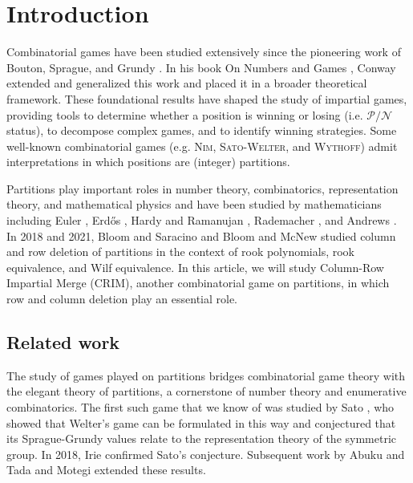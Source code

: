 \documentclass[pdflatex,sn-mathphys-num]{sn-jnl}%
\theoremstyle{thmstyleone}%
\theoremstyle{thmstyletwo}%
\theoremstyle{thmstylethree}%
\newcommand{\p}{\mathcal P}
\newcommand{\n}{\mathcal N}
\begin{document}
\section{Introduction}
Combinatorial games have been studied extensively since the pioneering work of Bouton, Sprague, and Grundy \cite{bouton1901nim,Spr35,Spr37,Gru39}. In his book On Numbers and Games \cite{Con76}, Conway extended and generalized this work and placed it in a broader theoretical framework. 
These foundational results have shaped the study of impartial games, providing tools to determine whether a position is winning or losing (i.e. $\p/\n$ status), to decompose complex games, and to identify winning strategies. 
Some well-known combinatorial games (e.g. \textsc{Nim}, \textsc{Sato-Welter}, and \textsc{Wythoff}) admit interpretations in which positions are (integer) partitions. 

Partitions play important roles in number theory, combinatorics, representation theory, and mathematical physics 
\cite{bohr86,AgarwalaAuluck1951,sagan2001symmetric,AuluckKothari1946}
and have been studied by mathematicians including Euler \cite{euler1797introductio}, Erd\H os \cite{erdos1946some}, Hardy and Ramanujan \cite{hardy1918asymptotic}, Rademacher \cite{rademacher1938partition}, and Andrews \cite{andrews1998theory, andrews2018integer}. 
In 2018 and 2021, 
 Bloom and Saracino \cite{zbMATH06870132} and Bloom and McNew \cite{zbMATH07369446} studied column and row deletion of partitions in the context of rook polynomials, rook equivalence, and Wilf equivalence. 
In this article, we will study Column-Row Impartial Merge (\textsc{CRIM}), another combinatorial game on partitions, in which row and column deletion play an essential role. 


\subsection{Related work} 
The study of games played on partitions bridges combinatorial game theory with the elegant theory of partitions, a cornerstone of number theory and enumerative combinatorics. 
The first such game that we know of was studied by Sato \cite{sato1970maya}, who showed that Welter's game can be formulated in this way and conjectured that its Sprague-Grundy values relate to the representation theory of the symmetric group. 
In 2018, Irie \cite{irie2018p} confirmed Sato's conjecture. 
Subsequent work by Abuku and Tada \cite{abuku2023multiple} and Motegi \cite{motegi2021gamepositionsmultiplehook} extended these results. 
\end{document}
